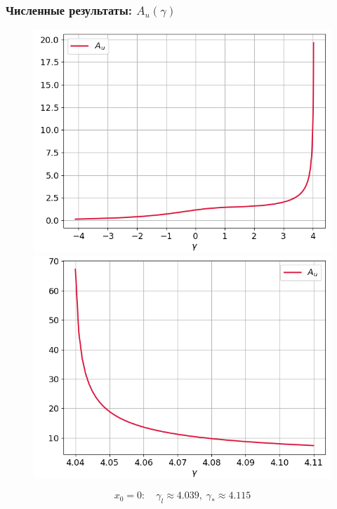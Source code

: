 \documentclass[fullscreen=true, unicode, bookmarks=false]{beamer}
\begin{document}
\begin{frame}
\frametitle{ Численные результаты: $ A_u(\gamma) $ }

\begin{figure} 
\includegraphics[scale=0.37]{divergent_amplitude_0_1.png}  
\hfill
\includegraphics[scale=0.37]{divergent_amplitude_0_2.png}  
\end{figure}

$$ x_0 = 0: \quad \gamma_l \approx 4.039, \; \gamma_* \approx 4.115 $$

\end{frame}
\end{document}
